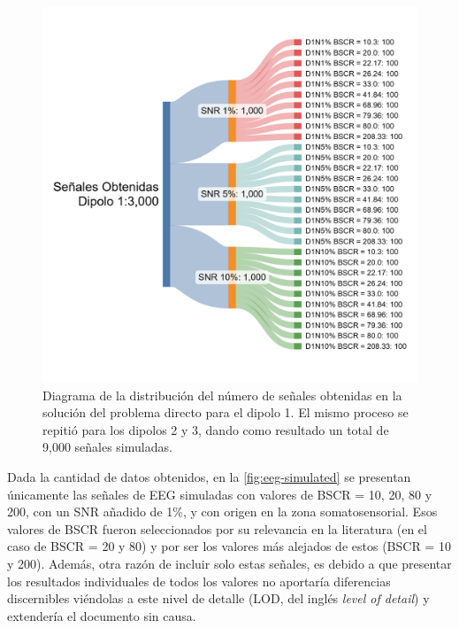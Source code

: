 \begin{figure}[tb]
    \centering
    \includegraphics[width=\textwidth]{gfx/sankey-direct.png}
    \caption{Diagrama de la distribución del número de señales obtenidas en la solución del problema directo para el dipolo 1. El mismo proceso se repitió para los dipolos 2 y 3, dando como resultado un total de 9,000 señales simuladas.}
    \label{fig:sankey-direct}
\end{figure}

Dada la cantidad de datos obtenidos, en la \cref{fig:eeg-simulated} se presentan únicamente las señales de EEG simuladas con valores de BSCR = 10, 20, 80 y 200, con un SNR añadido de 1\%, y con origen en la zona somatosensorial. 
Esos valores de BSCR fueron seleccionados por su relevancia en la literatura (en el caso de BSCR = 20 y 80) y por ser los valores más alejados de estos (BSCR = 10 y 200).
Además, otra razón de incluir solo estas señales, es debido a que presentar los resultados individuales de todos los valores no aportaría diferencias discernibles viéndolas a este nivel de detalle (LOD, del inglés \emph{level of detail}) y extendería el documento sin causa.

